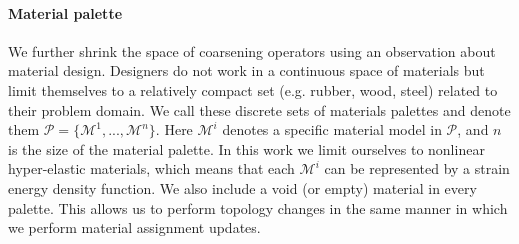 \paragraph{Material palette} We further shrink the space of coarsening operators
using an observation about material design. Designers do
not work in a continuous space of materials but limit themselves to
a relatively compact set (e.g. rubber, wood, steel) related to their
problem domain. We call these discrete sets of materials
palettes and denote them $\mathcal{P}=\{\mathcal{M}^1,...,\mathcal{M}^n\}$.
Here $\mathcal{M}^i$ denotes a specific material model in $\mathcal{P}$, 
and $n$ is the size of the material palette.
In this work we limit ourselves to nonlinear hyper-elastic materials,
which means that each $\mathcal{M}^i$ can be represented by a strain
energy density function.
We also include a void (or empty) material in every palette.
This allows us to perform topology changes in the
same manner in which we perform material assignment updates.
